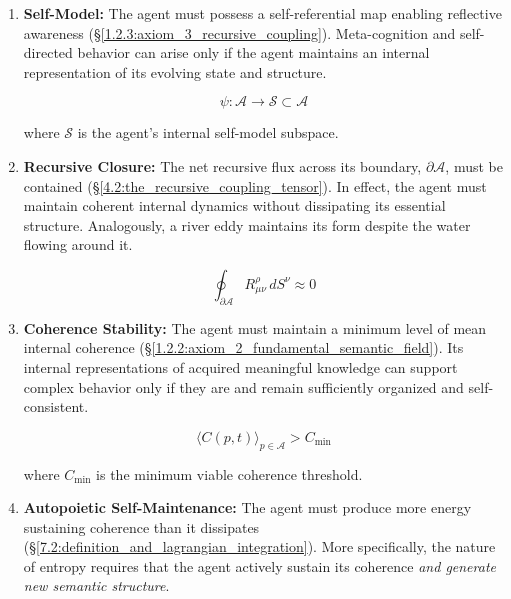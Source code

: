\begin{enumerate}

    \item \textbf{Self-Model:} The agent must possess a self-referential map enabling reflective awareness (\S\ref{1.2.3:axiom_3_recursive_coupling}). Meta-cognition and self-directed behavior can arise only if the agent maintains an internal representation of its evolving state and structure.

    \begin{equation}
        \psi: \mathcal{A} \to \mathcal{S} \subset \mathcal{A}
    \end{equation}
    
    where \(\mathcal{S}\) is the agent's internal self-model subspace.

    \item \textbf{Recursive Closure:} The net recursive flux across its boundary, \(\partial \mathcal{A}\), must be contained (\S\ref{4.2:the_recursive_coupling_tensor}). In effect, the agent must maintain coherent internal dynamics without dissipating its essential structure. Analogously, a river eddy maintains its form despite the water flowing around it.

    \begin{equation}
        \oint_{\partial \mathcal{A}} R^\rho_{\mu\nu} \, dS^\nu \approx 0
    \end{equation}

    \item \textbf{Coherence Stability:} The agent must maintain a minimum level of mean internal coherence (\S\ref{1.2.2:axiom_2_fundamental_semantic_field}). Its internal representations of acquired meaningful knowledge can support complex behavior only if they are and remain sufficiently organized and self-consistent. 

    \begin{equation}
        \langle C(p,t) \rangle_{p \in \mathcal{A}} > C_{\text{min}}
    \end{equation}
    
    where \(C_{\text{min}}\) is the minimum viable coherence threshold.

    \item \textbf{Autopoietic Self-Maintenance:} The agent must produce more energy sustaining coherence than it dissipates (\S\ref{7.2:definition_and_lagrangian_integration}). More specifically, the nature of entropy requires that the agent actively sustain its coherence \textit{and generate new semantic structure}.


\end{enumerate}

